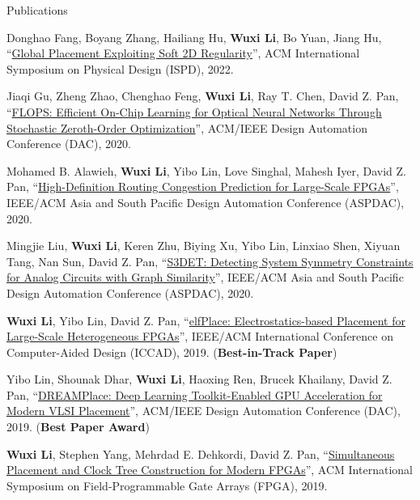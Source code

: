 \begin{rSection}{Publications}
\begin{description}[font=\normalfont]
\item[{[C12]}]{
    Donghao Fang, Boyang Zhang, Hailiang Hu, \textbf{Wuxi Li}, Bo Yuan, Jiang Hu,
    ``\href{https://dl.acm.org/doi/10.1145/3505170.3506723}{Global Placement Exploiting Soft 2D Regularity}'',
    ACM International Symposium on Physical Design (ISPD), 2022.
}

\item[{[C11]}]{
    Jiaqi Gu, Zheng Zhao, Chenghao Feng, \textbf{Wuxi Li}, Ray T. Chen, David Z. Pan,
    ``\href{https://ieeexplore.ieee.org/document/9218593}{FLOPS: Efficient On-Chip Learning for Optical Neural Networks Through Stochastic Zeroth-Order Optimization}'',
    ACM/IEEE Design Automation Conference (DAC), 2020.
}

\item[{[C10]}]{
    Mohamed B. Alawieh, \textbf{Wuxi Li}, Yibo Lin, Love Singhal, Mahesh Iyer, David Z. Pan,
    ``\href{https://ieeexplore.ieee.org/document/9045178}{High-Definition Routing Congestion Prediction for Large-Scale FPGAs}'',
    IEEE/ACM Asia and South Pacific Design Automation Conference (ASPDAC), 2020.
}

\item[{[C9]}]{
    Mingjie Liu, \textbf{Wuxi Li}, Keren Zhu, Biying Xu, Yibo Lin, Linxiao Shen, Xiyuan Tang, Nan Sun, David Z. Pan,
    ``\href{https://ieeexplore.ieee.org/document/9045109}{S3DET: Detecting System Symmetry Constraints for Analog Circuits with Graph Similarity}'',
    IEEE/ACM Asia and South Pacific Design Automation Conference (ASPDAC), 2020.
}

\item[{[C8]}]{
    \textbf{Wuxi Li}, Yibo Lin, David Z. Pan,
    ``\href{https://ieeexplore.ieee.org/document/8942075}{elfPlace: Electrostatics-based Placement for Large-Scale Heterogeneous FPGAs}'',
    IEEE/ACM International Conference on Computer-Aided Design (ICCAD), 2019.
    (\textbf{Best-in-Track Paper})
}

\item[{[C7]}]{
    Yibo Lin, Shounak Dhar, \textbf{Wuxi Li}, Haoxing Ren, Brucek Khailany, David Z. Pan,
    ``\href{https://dl.acm.org/citation.cfm?id=3317803}{DREAMPlace: Deep Learning Toolkit-Enabled GPU Acceleration for Modern VLSI Placement}'',
    ACM/IEEE Design Automation Conference (DAC), 2019.
    (\textbf{Best Paper Award})
}

\item[{[C6]}]{
    \textbf{Wuxi Li}, Stephen Yang, Mehrdad E. Dehkordi, David Z. Pan,
    ``\href{https://dl.acm.org/citation.cfm?id=3293897}{Simultaneous Placement and Clock Tree Construction for Modern FPGAs}'',
    ACM International Symposium on Field-Programmable Gate Arrays (FPGA), 2019.
}


\end{description}
\end{rSection}
